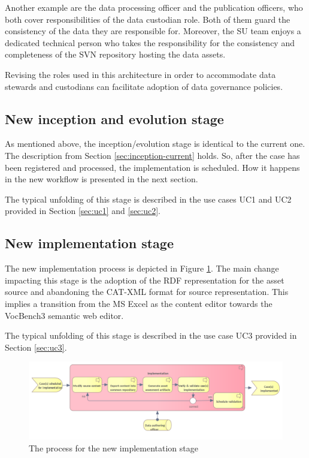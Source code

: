      Another example are the data processing officer and the publication officers, who both cover responsibilities of the data custodian role. Both of them guard the consistency of the data they are responsible for. Moreover, the SU team enjoys a dedicated technical person who takes the responsibility for the consistency and completeness of the SVN repository hosting the data assets.

    Revising the roles used in this architecture in order to accommodate data stewards and custodians can facilitate adoption of data governance policies.  
    
    \subsection{New inception and evolution stage}
	As mentioned above, the inception/evolution stage is identical to the current one. The description from Section \ref{sec:inception-current} holds. So, after the case has been registered and processed, the implementation is scheduled. How it happens in the new workflow is presented in the next section. 
	
	The typical unfolding of this stage is described in the use cases UC1 and UC2 provided in Section \ref{sec:uc1} and \ref{sec:uc2}.
	
	\subsection{New implementation stage}
	\label{sec:implementation-new}

	The new implementation process is depicted in Figure \ref{fig:implementation-new}. The main change impacting this stage is the adoption of the RDF representation for the asset source and abandoning the CAT-XML format for source representation. This implies a transition from the MS Excel as the content editor towards the VocBench3 \citep{stellato2017towards,stellatovocbench} semantic web editor. 
	
	The typical unfolding of this stage is described in the use case UC3 provided in Section \ref{sec:uc3}.		
	
	\begin{figure}[h]
		\centering
		\includegraphics[width=1.05\textwidth]{images/business/new/Implementation.png}
		\caption{The process for the new implementation stage}
		\label{fig:implementation-new}
	\end{figure} 


